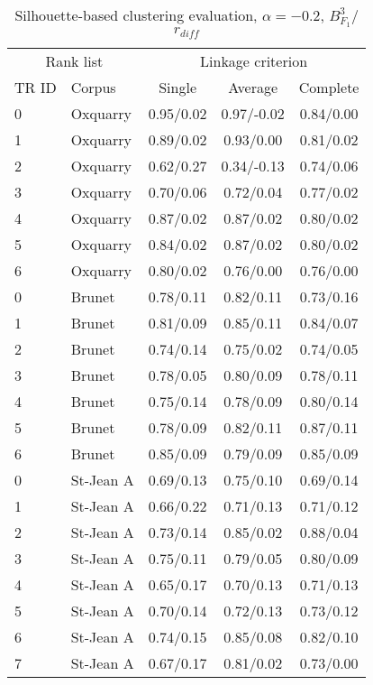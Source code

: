 \begin{table}[H]
  \centering
  \caption{Silhouette-based clustering evaluation, $\alpha = -0.2$, $B^3_{F_1}$/$r_{diff}$}
  \label{tab:silhouette-based_clustering_alpha_full}

  \begin{tabular}{l l c c c}
    \toprule
    \multicolumn{2}{c}{Rank list} & \multicolumn{3}{c}{Linkage criterion} \\
    TR ID & Corpus & Single & Average & Complete \\
    \midrule
    0 & Oxquarry & 0.95/0.02 &  0.97/-0.02 & 0.84/0.00 \\
    1 & Oxquarry & 0.89/0.02 & 0.93/0.00 & 0.81/0.02 \\
    2 & Oxquarry & 0.62/0.27 &  0.34/-0.13 & 0.74/0.06 \\
    3 & Oxquarry & 0.70/0.06 & 0.72/0.04 & 0.77/0.02 \\
    4 & Oxquarry & 0.87/0.02 & 0.87/0.02 & 0.80/0.02 \\
    5 & Oxquarry & 0.84/0.02 & 0.87/0.02 & 0.80/0.02 \\
    6 & Oxquarry & 0.80/0.02 & 0.76/0.00 & 0.76/0.00 \\
    0 & Brunet & 0.78/0.11 & 0.82/0.11 & 0.73/0.16 \\
    1 & Brunet & 0.81/0.09 & 0.85/0.11 & 0.84/0.07 \\
    2 & Brunet & 0.74/0.14 & 0.75/0.02 & 0.74/0.05 \\
    3 & Brunet & 0.78/0.05 & 0.80/0.09 & 0.78/0.11 \\
    4 & Brunet & 0.75/0.14 & 0.78/0.09 & 0.80/0.14 \\
    5 & Brunet & 0.78/0.09 & 0.82/0.11 & 0.87/0.11 \\
    6 & Brunet & 0.85/0.09 & 0.79/0.09 & 0.85/0.09 \\
    0 & St-Jean A & 0.69/0.13 & 0.75/0.10 & 0.69/0.14 \\
    1 & St-Jean A & 0.66/0.22 & 0.71/0.13 & 0.71/0.12 \\
    2 & St-Jean A & 0.73/0.14 & 0.85/0.02 & 0.88/0.04 \\
    3 & St-Jean A & 0.75/0.11 & 0.79/0.05 & 0.80/0.09 \\
    4 & St-Jean A & 0.65/0.17 & 0.70/0.13 & 0.71/0.13 \\
    5 & St-Jean A & 0.70/0.14 & 0.72/0.13 & 0.73/0.12 \\
    6 & St-Jean A & 0.74/0.15 & 0.85/0.08 & 0.82/0.10 \\
    7 & St-Jean A & 0.67/0.17 & 0.81/0.02 & 0.73/0.00 \\

\end{tabular}
\end{table}
